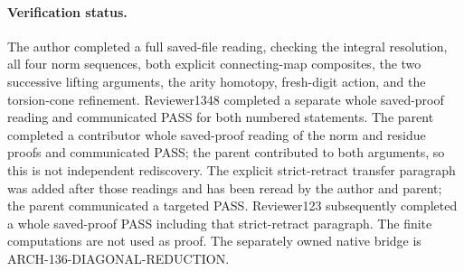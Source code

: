 \paragraph{Verification status.}
The author completed a full saved-file reading, checking the
integral resolution, all four norm sequences, both explicit
connecting-map composites, the two successive lifting arguments,
the arity homotopy, fresh-digit action, and the torsion-cone
refinement.  Reviewer1348 completed a separate whole saved-proof reading
and communicated PASS for both numbered statements.  The
parent completed a contributor whole saved-proof reading of
the norm and residue proofs and communicated PASS; the parent
contributed to both arguments, so this is not independent
rediscovery.  The explicit strict-retract transfer paragraph
was added after those readings and has been reread by the
author and parent; the parent communicated a targeted PASS.
Reviewer123 subsequently completed a whole saved-proof PASS
including that strict-retract paragraph.  The finite
computations are not used as proof.  The separately owned native
bridge is ARCH-136-DIAGONAL-REDUCTION.
